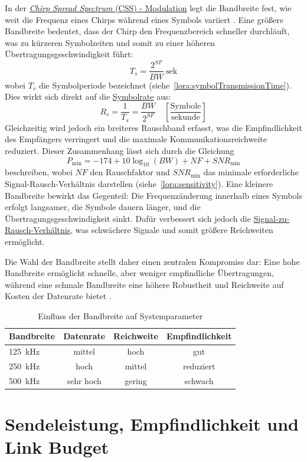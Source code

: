 	
	In der \hyperref[lora:modulation]{\textit{Chirp Spread Spectrum} (CSS) - Modulation} legt die Bandbreite fest, wie weit die Frequenz eines Chirps während eines Symbols variiert \cite{Semtech:2015}. Eine grö{\ss}ere Bandbreite bedeutet, dass der Chirp den Frequenzbereich schneller durchläuft, was zu kürzeren Symbolzeiten und somit zu einer höheren Übertragungsgeschwindigkeit führt:
	\[
	T_s = \frac{2^{SF}}{BW}~\text{sek}
	\]
	wobei \(T_s\) die Symbolperiode bezeichnet (siehe~\autoref{lora:symbolTransmissionTime}). Dies wirkt sich direkt auf die \hyperref[lora:symbolRate]{Symbolrate} aus:
	\[
	R_s = \frac{1}{T_s} = \frac{BW}{2^{SF}} \quad \left[\frac{\text{Symbole}}{\text{sekunde}}\right]
	\]
	Gleichzeitig wird jedoch ein breiteres Rauschband erfasst, was die Empfindlichkeit des Empfängers verringert und die maximale Kommunikationsreichweite reduziert. Dieser Zusammenhang lässt sich durch die Gleichung
	\[
	P_\text{min} = -174 + 10\log_{10}(BW) + NF + SNR_\text{min}
	\]
	beschreiben, wobei \(NF\) den Rauschfaktor und \(SNR_\text{min}\) das minimale erforderliche Signal-Rausch-Verhältnis darstellen (siehe~\ref{lora:sensitivity}). Eine kleinere Bandbreite bewirkt das Gegenteil: Die Frequenzänderung innerhalb eines Symbols erfolgt langsamer, die Symbole dauern länger, und die Übertragungsgeschwindigkeit sinkt. Dafür verbessert sich jedoch die \hyperref[lora:snr]{Signal-zu-Rausch-Verhältnis}, was schwächere Signale und somit grö{\ss}ere Reichweiten ermöglicht.
	
	Die Wahl der Bandbreite stellt daher einen zentralen Kompromiss dar: Eine hohe Bandbreite ermöglicht schnelle, aber weniger empfindliche Übertragungen, während eine schmale Bandbreite eine höhere Robustheit und Reichweite auf Kosten der Datenrate bietet \cite{Semtech:2015}.
	
	
	\begin{table}[H]
		\centering
		\caption{Einfluss der Bandbreite auf Systemparameter}
		\begin{tabular}{l|c|c|c}
			\textbf{Bandbreite} & \textbf{Datenrate} & \textbf{Reichweite} & \textbf{Empfindlichkeit} \\ \hline
			125~kHz & mittel & hoch & gut \\
			250~kHz & hoch & mittel & reduziert \\
			500~kHz & sehr hoch & gering & schwach \\
		\end{tabular}
	\end{table}

\section{Sendeleistung, Empfindlichkeit und Link Budget}
